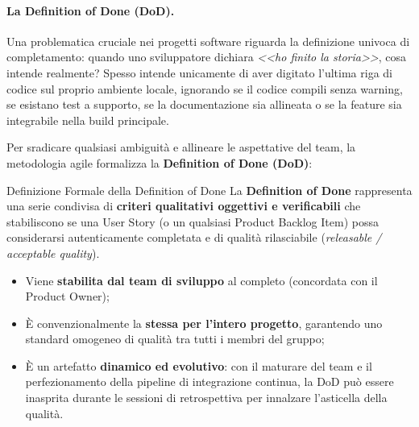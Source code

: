 \documentclass[12pt]{extarticle}
\begin{document}
\paragraph{La Definition of Done (DoD).}
Una problematica cruciale nei progetti software riguarda la definizione univoca di completamento: quando uno sviluppatore dichiara \textit{<<ho finito la storia>>}, cosa intende realmente? Spesso intende unicamente di aver digitato l'ultima riga di codice sul proprio ambiente locale, ignorando se il codice compili senza warning, se esistano test a supporto, se la documentazione sia allineata o se la feature sia integrabile nella build principale.

Per sradicare qualsiasi ambiguità e allineare le aspettative del team, la metodologia agile formalizza la \textbf{Definition of Done (DoD)}:
\begin{cbox}{Definizione Formale della Definition of Done}
\noindent La \textbf{Definition of Done} rappresenta una serie condivisa di \textbf{criteri qualitativi oggettivi e verificabili} che stabiliscono se una User Story (o un qualsiasi Product Backlog Item) possa considerarsi autenticamente completata e di qualità rilasciabile (\textit{releasable / acceptable quality}).
\begin{itemize}
    \item Viene \textbf{stabilita dal team di sviluppo} al completo (concordata con il Product Owner);
    \item È convenzionalmente la \textbf{stessa per l'intero progetto}, garantendo uno standard omogeneo di qualità tra tutti i membri del gruppo;
    \item È un artefatto \textbf{dinamico ed evolutivo}: con il maturare del team e il perfezionamento della pipeline di integrazione continua, la DoD può essere inasprita durante le sessioni di retrospettiva per innalzare l'asticella della qualità.
\end{itemize}
\end{cbox}
\end{document}
